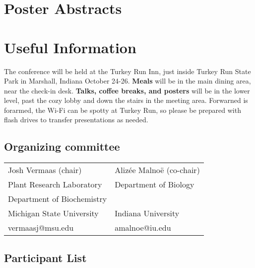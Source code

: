 \documentclass[
	openany, %
	parskip=full, %
	12pt, %
	letterpaper, %
]{conferencebooklet} %
\begin{document}
\chapter{Poster Abstracts} 
\begin{multicols}{3}
\begin{itemize}
	
\end{itemize}
\end{multicols}

 


\chapter{Useful Information}

The conference will be held at the Turkey Run Inn, just inside Turkey Run State Park in Marshall, Indiana October 24-26.
\textbf{Meals} will be in the main dining area, near the check-in desk. 
\textbf{Talks, coffee breaks, and posters} will be in the lower level, past the cozy lobby and down the stairs in the meeting area.
Forwarned is forarmed, the Wi-Fi can be spotty at Turkey Run, so please be prepared with flash drives to transfer presentations as needed.

\section{Organizing committee}

\begin{center}
	\begin{tabular}{ll}
	Josh Vermaas (chair)	&	Alizée Malnoë	 (co-chair) \\
		Plant Research Laboratory	&	Department of Biology \\
			Department of Biochemistry	&			\\
		Michigan State University	&		Indiana University \\
		vermaasj@msu.edu       		&	amalnoe@iu.edu\\
		
	\end{tabular}
\end{center}

\section{Participant List}






\newpage

\thispagestyle{empty} %
\pagecolor{myblue} %
~

\end{document}
